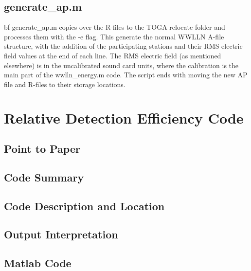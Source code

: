 \subsection{generate\_ap.m}

{bf generate\_ap.m} copies over the R-files to the TOGA relocate folder and processes them with the -e flag.
This generate the normal WWLLN A-file structure, with the addition of the participating stations and their RMS electric field values at the end of each line.
The RMS electric field (as mentioned elsewhere) is in the uncalibrated sound card units, where the calibration is the main part of the wwlln\_energy.m code.
The script ends with moving the new AP file and R-files to their storage locations.
\section{Relative Detection Efficiency Code}

\subsection{Point to Paper}

\subsection{Code Summary}

\subsection{Code Description and Location}

\subsection{Output Interpretation}

\subsection{Matlab Code}